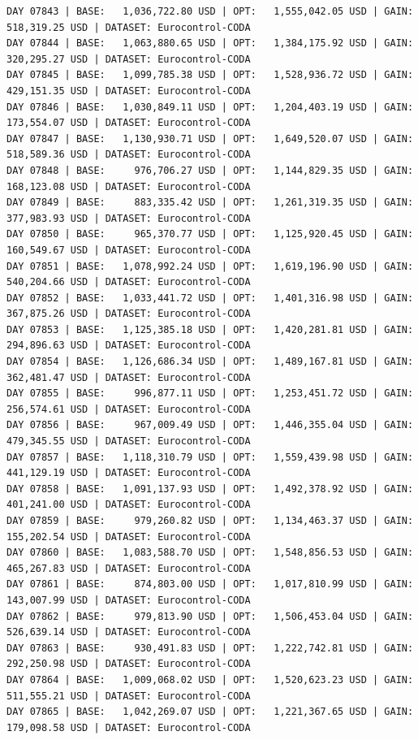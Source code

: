 \documentclass[11pt,a4paper]{article}
\begin{document}
\begin{verbatim}
DAY 07843 | BASE:   1,036,722.80 USD | OPT:   1,555,042.05 USD | GAIN: 518,319.25 USD | DATASET: Eurocontrol-CODA
DAY 07844 | BASE:   1,063,880.65 USD | OPT:   1,384,175.92 USD | GAIN: 320,295.27 USD | DATASET: Eurocontrol-CODA
DAY 07845 | BASE:   1,099,785.38 USD | OPT:   1,528,936.72 USD | GAIN: 429,151.35 USD | DATASET: Eurocontrol-CODA
DAY 07846 | BASE:   1,030,849.11 USD | OPT:   1,204,403.19 USD | GAIN: 173,554.07 USD | DATASET: Eurocontrol-CODA
DAY 07847 | BASE:   1,130,930.71 USD | OPT:   1,649,520.07 USD | GAIN: 518,589.36 USD | DATASET: Eurocontrol-CODA
DAY 07848 | BASE:     976,706.27 USD | OPT:   1,144,829.35 USD | GAIN: 168,123.08 USD | DATASET: Eurocontrol-CODA
DAY 07849 | BASE:     883,335.42 USD | OPT:   1,261,319.35 USD | GAIN: 377,983.93 USD | DATASET: Eurocontrol-CODA
DAY 07850 | BASE:     965,370.77 USD | OPT:   1,125,920.45 USD | GAIN: 160,549.67 USD | DATASET: Eurocontrol-CODA
DAY 07851 | BASE:   1,078,992.24 USD | OPT:   1,619,196.90 USD | GAIN: 540,204.66 USD | DATASET: Eurocontrol-CODA
DAY 07852 | BASE:   1,033,441.72 USD | OPT:   1,401,316.98 USD | GAIN: 367,875.26 USD | DATASET: Eurocontrol-CODA
DAY 07853 | BASE:   1,125,385.18 USD | OPT:   1,420,281.81 USD | GAIN: 294,896.63 USD | DATASET: Eurocontrol-CODA
DAY 07854 | BASE:   1,126,686.34 USD | OPT:   1,489,167.81 USD | GAIN: 362,481.47 USD | DATASET: Eurocontrol-CODA
DAY 07855 | BASE:     996,877.11 USD | OPT:   1,253,451.72 USD | GAIN: 256,574.61 USD | DATASET: Eurocontrol-CODA
DAY 07856 | BASE:     967,009.49 USD | OPT:   1,446,355.04 USD | GAIN: 479,345.55 USD | DATASET: Eurocontrol-CODA
DAY 07857 | BASE:   1,118,310.79 USD | OPT:   1,559,439.98 USD | GAIN: 441,129.19 USD | DATASET: Eurocontrol-CODA
DAY 07858 | BASE:   1,091,137.93 USD | OPT:   1,492,378.92 USD | GAIN: 401,241.00 USD | DATASET: Eurocontrol-CODA
DAY 07859 | BASE:     979,260.82 USD | OPT:   1,134,463.37 USD | GAIN: 155,202.54 USD | DATASET: Eurocontrol-CODA
DAY 07860 | BASE:   1,083,588.70 USD | OPT:   1,548,856.53 USD | GAIN: 465,267.83 USD | DATASET: Eurocontrol-CODA
DAY 07861 | BASE:     874,803.00 USD | OPT:   1,017,810.99 USD | GAIN: 143,007.99 USD | DATASET: Eurocontrol-CODA
DAY 07862 | BASE:     979,813.90 USD | OPT:   1,506,453.04 USD | GAIN: 526,639.14 USD | DATASET: Eurocontrol-CODA
DAY 07863 | BASE:     930,491.83 USD | OPT:   1,222,742.81 USD | GAIN: 292,250.98 USD | DATASET: Eurocontrol-CODA
DAY 07864 | BASE:   1,009,068.02 USD | OPT:   1,520,623.23 USD | GAIN: 511,555.21 USD | DATASET: Eurocontrol-CODA
DAY 07865 | BASE:   1,042,269.07 USD | OPT:   1,221,367.65 USD | GAIN: 179,098.58 USD | DATASET: Eurocontrol-CODA

\end{verbatim}
\end{document}
